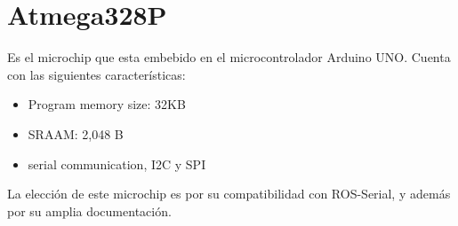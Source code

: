 \section{Atmega328P}
Es el microchip que esta embebido en el microcontrolador Arduino UNO. Cuenta con las siguientes características:
\begin{itemize}
    \item Program memory size: 32KB
    \item SRAAM: 2,048 B
    \item serial communication, I2C y SPI
\end{itemize}

La elección de este microchip es por su compatibilidad con ROS-Serial, y además por su amplia documentación.